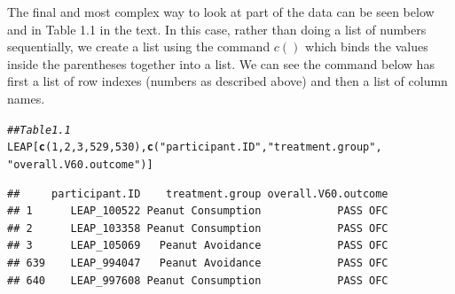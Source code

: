 \documentclass[11pt]{article}\usepackage[]{graphicx}\usepackage[]{color}
\makeatletter
\newcommand{\hlnum}[1]{\textcolor[rgb]{0.686,0.059,0.569}{#1}}%
\newcommand{\hlstr}[1]{\textcolor[rgb]{0.192,0.494,0.8}{#1}}%
\newcommand{\hlcom}[1]{\textcolor[rgb]{0.678,0.584,0.686}{\textit{#1}}}%
\newcommand{\hlstd}[1]{\textcolor[rgb]{0.345,0.345,0.345}{#1}}%
\newcommand{\hlkwd}[1]{\textcolor[rgb]{0.737,0.353,0.396}{\textbf{#1}}}%
\newenvironment{kframe}{%
 \def\at@end@of@kframe{}%
 \ifinner\ifhmode%
  \def\at@end@of@kframe{\end{minipage}}%
  \begin{minipage}{\columnwidth}%
 \fi\fi%
 \def\FrameCommand##1{\hskip\@totalleftmargin \hskip-\fboxsep
 \colorbox{shadecolor}{##1}\hskip-\fboxsep
     \hskip-\linewidth \hskip-\@totalleftmargin \hskip\columnwidth}%
 \MakeFramed {\advance\hsize-\width
   \@totalleftmargin\z@ \linewidth\hsize
   \@setminipage}}%
 {\par\unskip\endMakeFramed%
 \at@end@of@kframe}
\newenvironment{knitrout}{}{} %
\makeatother
\begin{document}
The final and most complex way to look at part of the data can be seen below and in Table 1.1 in the text. In this case, rather than doing a list of numbers sequentially, we create a list using the command $c()$ which binds the values inside the parentheses together into a list.  We can see the command below has first a list of row indexes (numbers as described above) and then a list of column names.

\begin{knitrout}
\color{fgcolor}\begin{kframe}
\begin{alltt}
\hlcom{## Table 1.1}
\hlstd{LEAP[}\hlkwd{c}\hlstd{(}\hlnum{1}\hlstd{,}\hlnum{2}\hlstd{,}\hlnum{3}\hlstd{,}\hlnum{529}\hlstd{,} \hlnum{530}\hlstd{),}\hlkwd{c}\hlstd{(}\hlstr{"participant.ID"}\hlstd{,} \hlstr{"treatment.group"}\hlstd{,}
                         \hlstr{"overall.V60.outcome"}\hlstd{)]}
\end{alltt}
\begin{verbatim}
##     participant.ID    treatment.group overall.V60.outcome
## 1      LEAP_100522 Peanut Consumption            PASS OFC
## 2      LEAP_103358 Peanut Consumption            PASS OFC
## 3      LEAP_105069   Peanut Avoidance            PASS OFC
## 639    LEAP_994047   Peanut Avoidance            PASS OFC
## 640    LEAP_997608 Peanut Consumption            PASS OFC
\end{verbatim}
\end{kframe}
\end{knitrout}
\end{document}
